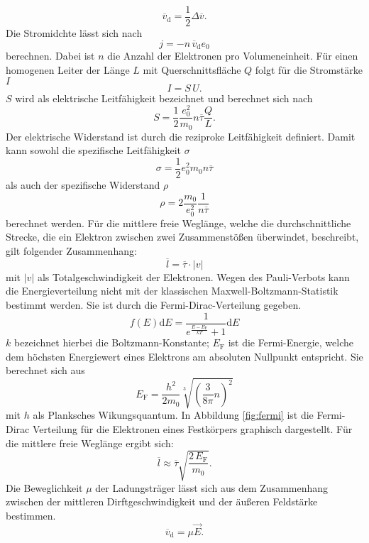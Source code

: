 \begin{equation}
\overline{v}_\mathrm{d} = \frac{1}{2}\Delta \overline{v}.
\end{equation}
Die Stromidchte lässt sich nach
\begin{equation}
  j=-n\,\overline{v}_\mathrm{d} e_0
\end{equation}
berechnen. Dabei ist $n$ die Anzahl der Elektronen pro Volumeneinheit.
Für einen homogenen Leiter der Länge $L$ mit Querschnittsfläche $Q$ folgt für die Stromstärke $I$
\begin{equation}
  I=S\,U.
\end{equation}
$S$ wird als elektrische Leitfähigkeit bezeichnet und berechnet sich nach
\begin{equation}
  \label{eqn:S}
  S=\frac{1}{2}\frac{e_0 ^2}{m_0}n\overline{\tau}\frac{Q}{L}.
\end{equation}
Der elektrische Widerstand ist durch die reziproke Leitfähigkeit definiert. Damit kann sowohl die spezifische Leitfähigkeit $\sigma$
\begin{equation}
  \sigma = \frac{1}{2}{e_0 ^2}{m_0}n\overline{\tau}
\end{equation}
als auch der spezifische Widerstand $\rho$
\begin{equation}
  \rho = 2 \frac{m_0}{e_0 ^2}\frac{1}{n\overline{\tau}}
\end{equation}
berechnet werden.
Für die mittlere freie Weglänge, welche die durchschnittliche Strecke, die ein Elektron zwischen zwei Zusammenstößen überwindet, beschreibt, gilt folgender Zusammenhang:
\begin{equation}
  \overline{l}=\overline{\tau}\cdot|v|
\end{equation}
mit $|v|$ als Totalgeschwindigkeit der Elektronen.
Wegen des Pauli-Verbots kann die Energieverteilung nicht mit der klassischen Maxwell-Boltzmann-Statistik bestimmt werden. Sie ist durch die Fermi-Dirac-Verteilung gegeben.
\begin{equation}
  f(E)\mathrm{d}E= \frac{1}{e^{\frac{E-E_\mathrm{F}}{kT}}+1}\mathrm{d}E
\end{equation}
$k$ bezeichnet hierbei  die Boltzmann-Konstante; $E_\mathrm{F}$ ist die Fermi-Energie, welche dem höchsten Energiewert eines Elektrons am absoluten Nullpunkt entspricht. Sie berechnet sich aus
\begin{equation}
E_\mathrm{F}=\frac{h^2}{2m_0}\sqrt[3]{\left( \frac{3}{8\pi}n\right)^2}
\end{equation}
mit $h$ als Planksches Wikungsquantum.
In Abbildung \ref{fig:fermi} ist die Fermi-Dirac Verteilung für die Elektronen eines Festkörpers graphisch dargestellt.
Für die mittlere freie Weglänge ergibt sich:
\begin{equation}
\overline{l} \approx \overline{\tau}\sqrt{\frac{2\,E_\mathrm{F}}{m_0}}.
\end{equation}
Die Beweglichkeit $\mu$ der Ladungsträger lässt sich aus dem Zusammenhang zwischen der mittleren Dirftgeschwindigkeit und der äußeren Feldstärke bestimmen.
\begin{equation}
\overline{v}_\mathrm{d}=\mu \vec{E}.
\end{equation}

